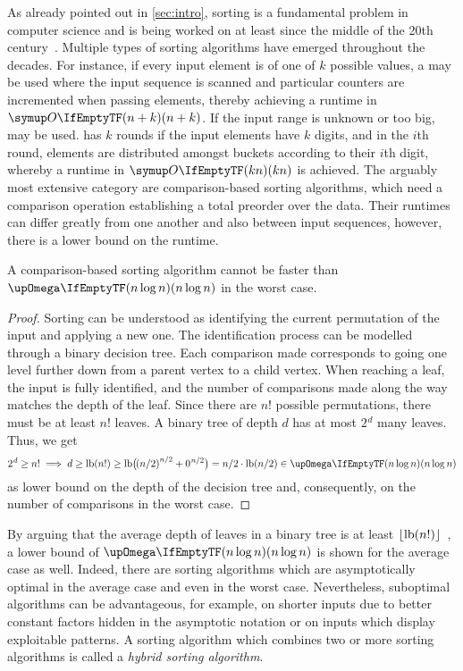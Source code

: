 As already pointed out in \cref{sec:intro}, sorting is a fundamental problem in computer science and is being worked on at least since the middle of the 20th century~\cite{hoare1962quicksort,williams1964heapsort,floyd1964treesort}.
Multiple types of sorting algorithms have emerged throughout the decades.
For instance, if every input element is of one of \(k\) possible values, a \CS{} may be used where the input sequence is scanned and particular counters are incremented when passing elements, thereby achieving a runtime in \(\bigoh{n +  k}\).
If the input range is unknown or too big, \RS{} may be used.
\RS{} has \(k\) rounds if the input elements have \(k\) digits, and in the \(i\)th round, elements are distributed amongst buckets according to their \(i\)th digit, whereby a runtime in \(\bigoh{kn}\) is achieved.
The arguably most extensive category are comparison-based sorting algorithms, which need a comparison operation establishing a total preorder over the data.
Their runtimes can differ greatly from one another and also between input sequences, however, there is a lower bound on the runtime.
\begin{theorem}
	A comparison-based sorting algorithm cannot be faster than \(\bigomega{n \log n}\) in the worst case.~\cite[91\psq]{maurer1974datenstrukturen}
\end{theorem}
\begin{proof}
	Sorting can be understood as identifying the current permutation of the input and applying a new one.
	The identification process can be modelled through a binary decision tree.
	Each comparison made corresponds to going one level further down from a parent vertex to a child vertex.
	When reaching a leaf, the input is fully identified, and the number of comparisons made along the way matches the depth of the leaf.
	Since there are \(n!\) possible permutations, there must be at least \(n!\) leaves.
	A binary tree of depth \(d\) has at most \(2\mspace{1mu}^d\) many leaves.
	Thus, we get
	\begin{equation*}
		2\mspace{1mu}^d \ge n! \implies d \ge \lb(n!) \ge \lb\paren[\big]{\mspace{-2mu}\paren*{n/2}^{n/2} + 0\mspace{1mu}^{n/2}} = n/2 \cdot \lb\paren{n/2} \in \bigomega{n \log n}
	\end{equation*}
	as lower bound on the depth of the decision tree and, consequently, on the number of comparisons in the worst case.
\end{proof}
By arguing that the average depth of leaves in a binary tree is at least \(\lfloor\operatorname{lb}(n!)\rfloor\)~\cite{blum2011comparison}, a lower bound of \(\bigomega{n \log n}\) is shown for the average case as well.
Indeed, there are sorting algorithms which are asymptotically optimal in the average case and even in the worst case.
Nevertheless, suboptimal algorithms can be advantageous, for example, on shorter inputs due to better constant factors hidden in the asymptotic notation or on inputs which display exploitable patterns.
A sorting algorithm which combines two or more sorting algorithms is called a \emph{hybrid sorting algorithm}.

